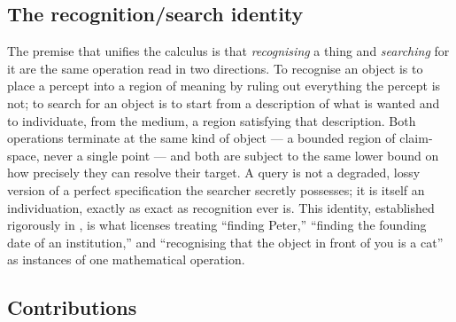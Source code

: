 \documentclass[11pt,twocolumn,a4paper]{article}
\theoremstyle{thmstyle}
\theoremstyle{definition}
\theoremstyle{remark}
\begin{document}
\subsection{The recognition/search identity}

The premise that unifies the calculus is that \emph{recognising} a thing
and \emph{searching} for it are the same operation read in two directions.
To recognise an object is to place a percept into a region of meaning by
ruling out everything the percept is not; to search for an object is to
start from a description of what is wanted and to individuate, from the
medium, a region satisfying that description. Both operations terminate at
the same kind of object --- a bounded region of claim-space, never a single
point --- and both are subject to the same lower bound on how precisely
they can resolve their target. A query is not a degraded, lossy version of
a perfect specification the searcher secretly possesses; it is itself an
individuation, exactly as exact as recognition ever is. This identity,
established rigorously in , is what licenses
treating ``finding Peter,'' ``finding the founding date of an institution,''
and ``recognising that the object in front of you is a cat'' as instances
of one mathematical operation.

\subsection{Contributions}
\end{document}
